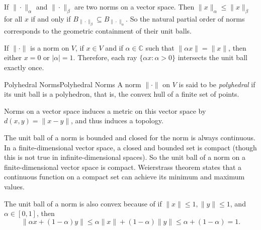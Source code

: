 \documentclass[../main.tex]{subfiles}
\begin{document}
If $\|\cdot\|_{\alpha}$ and $\|\cdot\|_{\beta}$ are two norms on a vector space. Then $\|x\|_{\alpha} \leq \|x\|_{\beta}$ for all $x$ if and only if $B_{\|\cdot\|_{\beta}} \subseteq B_{\|\cdot\|_{\alpha}}$. So the natural partial order of norms corresponds to the geometric containment of their unit balls.

If $\|\cdot\|$ is a norm on $V$, if $x\in V$ and if $\alpha\in \mathbb{C}$ such that $\|\alpha x\| = \|x\|$, then either $x=0$ or $|\alpha| = 1$. Therefore, each ray $\{ \alpha x: \alpha > 0\}$ intersects the unit ball exactly once.

\begin{definition}{Polyhedral Norms}{Polyhedral Norms}
  A norm $\|\cdot\|$ on $V$ is said to be \textit{polyhedral} if its unit ball is a polyhedron, that is, the convex hull of a finite set of points.
\end{definition}
Norms on a vector space induces a metric on this vector space by $d(x,y) = \|x - y\|$, and thus induces a topology.

The unit ball of a norm is bounded and closed for the norm is always continuous. In a finite-dimensional vector space, a closed and bounded set is compact (though this is not true in infinite-dimensional spaces). So the unit ball of a norm on a finite-dimensional vector space is compact. Weierstrass theorem states that a continuous function on a compact set can achieve its minimum and maximum values.

The unit ball of a norm is also convex because of if $\|x\| \leq 1, \|y\| \leq 1$, and $\alpha \in [0, 1]$, then
\begin{equation*}
  \|\alpha x + (1 - \alpha) y\| \leq \alpha \|x\| + (1 - \alpha) \|y\| \leq \alpha + (1 - \alpha) = 1.
\end{equation*}
\end{document}
